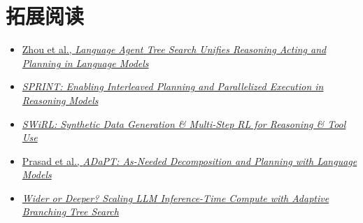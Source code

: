 \section{拓展阅读}

\begin{itemize}
    \item \href{https://arxiv.org/abs/2310.04406}{Zhou et al., \emph{Language Agent Tree Search Unifies Reasoning Acting and Planning in Language Models}}
    \item \href{https://arxiv.org/abs/2506.05745}{\emph{SPRINT: Enabling Interleaved Planning and Parallelized Execution in Reasoning Models}}
    \item \href{https://arxiv.org/abs/2504.04736}{\emph{SWiRL: Synthetic Data Generation \& Multi-Step RL for Reasoning \& Tool Use}}
    \item \href{https://arxiv.org/abs/2311.05772}{Prasad et al., \emph{ADaPT: As-Needed Decomposition and Planning with Language Models}}
    \item \href{https://arxiv.org/abs/2503.04412}{\emph{Wider or Deeper? Scaling LLM Inference-Time Compute with Adaptive Branching Tree Search}}
\end{itemize}

